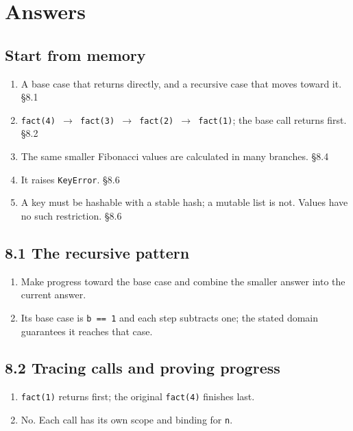 \documentclass[11pt]{article}
\begin{document}
\section{Answers}
\begin{keepsection}\subsection{Start from memory}

\begin{enumerate}
\item A base case that returns directly, and a recursive case that moves toward it. \hfill{\small\color{FAUblue}§8.1}
\item \texttt{fact(4) \ensuremath{\to} fact(3) \ensuremath{\to} fact(2) \ensuremath{\to} fact(1)}; the base call returns first. \hfill{\small\color{FAUblue}§8.2}
\item The same smaller Fibonacci values are calculated in many branches. \hfill{\small\color{FAUblue}§8.4}
\item It raises \texttt{KeyError}. \hfill{\small\color{FAUblue}§8.6}
\item A key must be hashable with a stable hash; a mutable list is not. Values have no such restriction. \hfill{\small\color{FAUblue}§8.6}
\end{enumerate}

\end{keepsection}
\begin{keepsection}\subsection{8.1 The recursive pattern}

\begin{enumerate}
\item Make progress toward the base case and combine the smaller answer into the current answer.
\item Its base case is \texttt{b == 1} and each step subtracts one; the stated domain guarantees it reaches that case.
\end{enumerate}

\end{keepsection}
\begin{keepsection}\subsection{8.2 Tracing calls and proving progress}

\begin{enumerate}
\item \texttt{fact(1)} returns first; the original \texttt{fact(4)} finishes last.
\item No. Each call has its own scope and binding for \texttt{n}.
\end{enumerate}

\end{keepsection}
\end{document}

